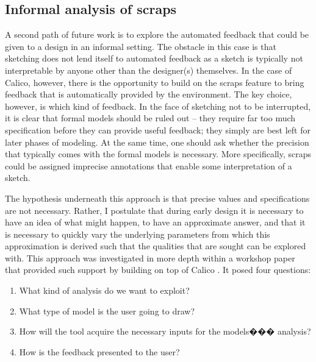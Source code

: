 \subsection{Informal analysis of scraps}
%
%
%
%
A second path of future work is to explore the automated feedback that could be given to a design in an informal setting. The obstacle in this case is that sketching does not lend itself to automated feedback as a sketch is typically not interpretable by anyone other than the designer(s) themselves. In the case of Calico, however, there is the opportunity to build on the scraps feature to bring feedback that is automatically provided by the environment. The key choice, however, is which kind of feedback. In the face of sketching not to be interrupted, it is clear that formal models should be ruled out -- they require far too much specification before they can provide useful feedback; they simply are best left for later phases of modeling. At the same time, one should ask whether the precision that typically comes with the formal models is necessary. More specifically, scraps could be assigned imprecise annotations that enable some interpretation of a sketch.

The hypothesis underneath this approach is that precise values and specifications are not necessary. Rather, I postulate that during early design it is necessary to have an idea of what might happen, to have an approximate answer, and that it is necessary to quickly vary the underlying parameters from which this approximation is derived such that the qualities that are sought can be explored with. 
This approach was investigated in more depth within a workshop paper that provided such support by building on top of Calico \cite{mottalightweight}. It posed four questions:

\begin{enumerate}
	\item What kind of analysis do we want to exploit? 
	\item What type of model is the user going to draw? 
	\item How will the tool acquire the necessary inputs for the models��� analysis? 
	\item How is the feedback presented to the user?
\end{enumerate}

